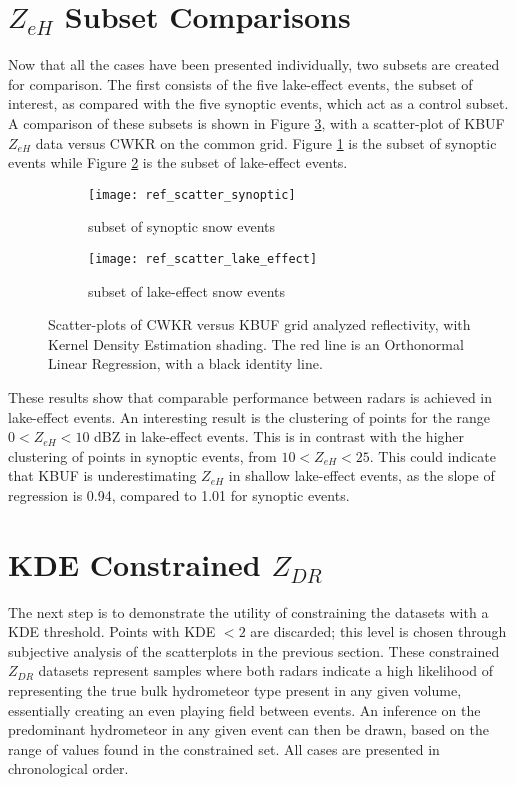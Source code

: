 \section{$Z_{eH}$ Subset Comparisons}
Now that all the cases have been presented individually, two subsets are created for comparison. The first consists of the five lake-effect events, the
subset of interest, as compared with the five synoptic events, which act as a control subset.
A comparison of these subsets is shown in Figure \ref{fig:ref_scatter}, with a scatter-plot of KBUF $Z_{eH}$ data versus CWKR on the common grid. Figure
\ref{fig:ref_synoptic} is the subset of synoptic events while Figure \ref{fig:ref_lake_effect} is the subset of lake-effect events. 
\begin{figure}[H]
\centering
   \begin{subfigure}{0.49\linewidth} \centering
     \texttt{[image: ref\_scatter\_synoptic]}
     \caption{subset of synoptic snow events}\label{fig:ref_synoptic}
   \end{subfigure}
   \begin{subfigure}{0.49\linewidth} \centering
     \texttt{[image: ref\_scatter\_lake\_effect]}
     \caption{subset of lake-effect snow events}\label{fig:ref_lake_effect}
   \end{subfigure}
\caption{Scatter-plots of CWKR versus KBUF grid analyzed reflectivity, with Kernel Density Estimation shading. The red line is an Orthonormal Linear
Regression, with a black identity line.} \label{fig:ref_scatter}
\end{figure}
These results show that
comparable performance between radars is achieved in lake-effect events. An interesting result is the clustering of points for the range $0 < Z_{eH} < 10$
dBZ in lake-effect events. This is in contrast with the higher clustering of points in synoptic events, from $10 < Z_{eH} < 25$. This could indicate that KBUF is underestimating $Z_{eH}$ in shallow lake-effect events, as the slope of regression is 0.94, compared to 1.01 for synoptic events.

\section{KDE Constrained $Z_{DR}$}
The next step is to demonstrate the utility of constraining the datasets with a KDE threshold. Points with KDE $< 2$ are discarded; this level is chosen
through subjective analysis of the scatterplots in the previous section. These constrained $Z_{DR}$ datasets represent samples where both radars indicate a
high likelihood of representing the true bulk hydrometeor type present in any given volume, essentially creating an even playing field between events. An
inference on the predominant hydrometeor in any given event can then be drawn, based on the range of values found in the constrained set. All cases are
presented in chronological order.
